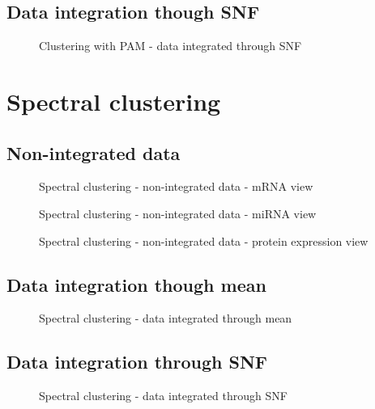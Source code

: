 \subsection{Data integration though SNF}\label{pam_SNF}
\begin{figure}\label{fig:pam_SNF}
    \centering
    \caption{Clustering with PAM - data integrated through SNF}
\end{figure}

\section{Spectral clustering}\label{results_sc}
\subsection{Non-integrated data}\label{sc_nonIntegrated}
\begin{figure}\label{fig:sc_1}
    \centering
    \caption{Spectral clustering - non-integrated data - mRNA view}
\end{figure}
\begin{figure}\label{fig:sc_2}
    \centering
    \caption{Spectral clustering - non-integrated data - miRNA view}
\end{figure}
\begin{figure}\label{fig:sc_3}
    \centering
    \caption{Spectral clustering - non-integrated data - protein expression view}
\end{figure}

\subsection{Data integration though mean}\label{sc_mean}
\begin{figure}\label{fig:sc_mean}
    \centering
    \caption{Spectral clustering - data integrated through mean}
\end{figure}

\subsection{Data integration through SNF}\label{sc_SNF}
\begin{figure}\label{fig:sc_SNF}
    \centering
    \caption{Spectral clustering - data integrated through SNF}
\end{figure}